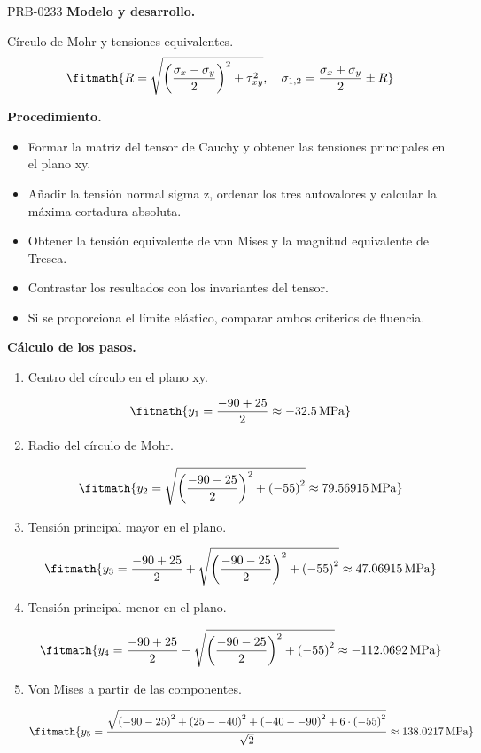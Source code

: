 \begin{studiumworked}{PRB-0233}
\textbf{Modelo y desarrollo.}

Círculo de Mohr y tensiones equivalentes.\[\fitmath{R=\sqrt{\left(\frac{\sigma_x-\sigma_y}{2}\right)^2+\tau_{xy}^{2}},\quad\sigma_{1,2}=\frac{\sigma_x+\sigma_y}{2}\pm R}\]

\textbf{Procedimiento.}\begin{itemize}\item Formar la matriz del tensor de Cauchy y obtener las tensiones principales en el plano xy.
\item Añadir la tensión normal sigma z, ordenar los tres autovalores y calcular la máxima cortadura absoluta.
\item Obtener la tensión equivalente de von Mises y la magnitud equivalente de Tresca.
\item Contrastar los resultados con los invariantes del tensor.
\item Si se proporciona el límite elástico, comparar ambos criterios de fluencia.\end{itemize}

\textbf{Cálculo de los pasos.}

\begin{enumerate}

\item Centro del círculo en el plano xy.

\[\fitmath{y_{1}=\frac{-90+25}{2}\approx -32.5\,\mathrm{MPa}}\]

\item Radio del círculo de Mohr.

\[\fitmath{y_{2}=\sqrt{{\left(\frac{-90-25}{2}\right)}^{2}+{\left(-55\right)}^{2}}\approx 79.56915\,\mathrm{MPa}}\]

\item Tensión principal mayor en el plano.

\[\fitmath{y_{3}=\frac{-90+25}{2}+\sqrt{{\left(\frac{-90-25}{2}\right)}^{2}+{\left(-55\right)}^{2}}\approx 47.06915\,\mathrm{MPa}}\]

\item Tensión principal menor en el plano.

\[\fitmath{y_{4}=\frac{-90+25}{2}-\sqrt{{\left(\frac{-90-25}{2}\right)}^{2}+{\left(-55\right)}^{2}}\approx -112.0692\,\mathrm{MPa}}\]

\item Von Mises a partir de las componentes.

\[\fitmath{y_{5}=\frac{\sqrt{{\left(-90-25\right)}^{2}+{\left(25--40\right)}^{2}+{\left(-40--90\right)}^{2}+6\cdot {\left(-55\right)}^{2}}}{\sqrt{2}}\approx 138.0217\,\mathrm{MPa}}\]


\end{enumerate}
\end{studiumworked}
